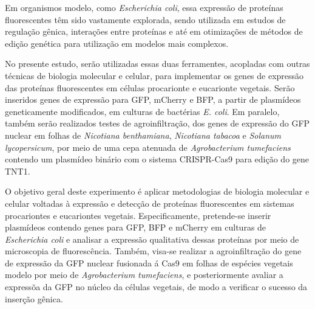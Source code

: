 Em organismos modelo, como \textit{Escherichia coli}, essa expressão de proteínas fluorescentes têm sido vastamente explorada, sendo utilizada em estudos de regulação gênica, interações entre proteínas e até em otimizações de métodos de edição genética para utilização em modelos mais complexos. 

No presente estudo, serão utilizadas essas duas ferramentes, acopladas com outras técnicas de biologia molecular e celular, para implementar os genes de expressão das proteínas fluorescentes em células procarionte e eucarionte vegetais. Serão inseridos genes de expressão para GFP, mCherry e BFP, a partir de plasmídeos geneticamente modificados, em culturas de bactérias \textit{E. coli}. Em paralelo, também serão realizados testes de agroinfiltração, dos genes de expressão do GFP nuclear em folhas de \textit{Nicotiana benthamiana}, \textit{Nicotiana tabacoa} e \textit{Solanum lycopersicum}, por meio de uma cepa atenuada de \textit{Agrobacterium tumefaciens} contendo um plasmídeo binário com o sistema CRISPR-Cas9 para edição do gene TNT1.

O objetivo geral deste experimento é aplicar metodologias de biologia molecular e celular voltadas à expressão e detecção de proteínas fluorescentes em sistemas procariontes e eucariontes vegetais. Especificamente, pretende-se inserir plasmídeos contendo genes para GFP, BFP e mCherry em culturas de \textit{Escherichia coli}  e analisar a expressão qualitativa dessas proteínas por meio de microscopia de fluorescência. Também, visa-se realizar a  agroinfiltração do gene de expressão da GFP nuclear fusionada á Cas9 em folhas de espécies vegetais modelo por meio de \textit{Agrobacterium tumefaciens}, e posteriormente avaliar a expressõa da GFP no núcleo da células vegetais, de modo a verificar o sucesso da inserção gênica. 